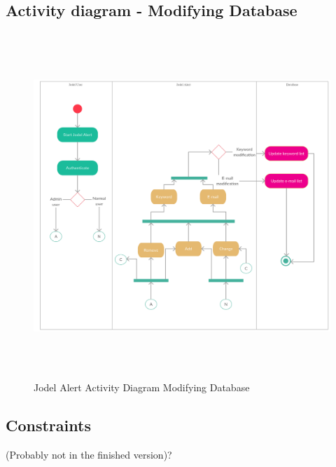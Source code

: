 \documentclass[a4paper,12pt]{article}
\begin{document}
\subsection{Activity diagram - Modifying Database}
\begin{figure}[!h]
	\centering
	\includegraphics[height=13cm]{img/Activity_diagram-Modifying_database.pdf}
	\caption{Jodel Alert Activity Diagram Modifying Database}
	\label{Jodel}
\end{figure}
\clearpage
\subsection{Constraints}
(Probably not in the finished version)?
\end{document}
